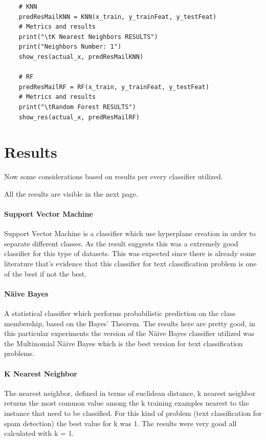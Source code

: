 \documentclass[a4paper]{report}
\begin{document}
\lstset{ language=json}
\begin{lstlisting}
	# KNN
	predResMailKNN = KNN(x_train, y_trainFeat, y_testFeat)
	# Metrics and results
	print("\tK Nearest Neighbors RESULTS")
	print("Neighbors Number: 1")
	show_res(actual_x, predResMailKNN)
	
	# RF
	predResMailRF = RF(x_train, y_trainFeat, y_testFeat)
	# Metrics and results
	print("\tRandom Forest RESULTS")
	show_res(actual_x, predResMailRF)
\end{lstlisting}
\chapter{Results}
Now some considerations based on results per every classifier utilized.

\noindent All the results are visible in the next page.

\subsubsection{Support Vector Machine}
Support Vector Machine is a classifier which use hyperplane creation in order to separate different classes. As the result suggests this was a extremely good classifier for this type of datasets. This was expected since there is already some literature that's evidence that this classifier for text classification problem is one of the best if not the best.  

\subsubsection{Näive Bayes}
A statistical classifier which performs probabilistic prediction on the class membership, based on the Bayes' Theorem. The results here are pretty good, in this particular experiments the version of the Näive Bayes classifier utilized was the Multinomial Näive Bayes which is the best version for text classification problems.

\subsubsection{K Nearest Neighbor}
The nearest neighbor, defined in terms of euclidean distance, k nearest neighbor returns the most common value among the k training examples nearest to the instance that need to be classified. For this kind of problem (text classification for spam detection) the best value for k was 1. The results were very good all calculated with k = 1.
\end{document}
